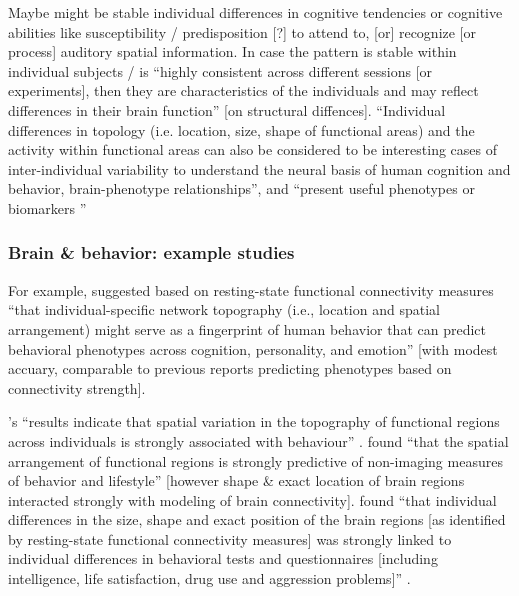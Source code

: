 %
Maybe might be stable individual differences in cognitive tendencies or
cognitive abilities like susceptibility / predisposition [?] to attend to, [or]
recognize [or process] auditory spatial information.
In case the pattern is stable within individual subjects / is ``highly
consistent across different sessions [or experiments], then they are
characteristics of the individuals and may reflect differences in their brain
function'' \citep{kanai2011structural} [on structural diffences].
%
``Individual differences in topology (i.e. location, size, shape of functional
areas) and the activity within functional areas can also be considered to be
interesting cases of inter-individual variability to understand the neural basis
of human cognition and behavior, brain-phenotype relationships'', and ``present
useful phenotypes or biomarkers \citep{glasser2016multi,
vanhorn2008individual}''


\subsubsection{Brain \& behavior: example studies}

%
For example, \citet{kong2019spatial} suggested based on resting-state functional
connectivity measures ``that individual-specific network topography (i.e.,
location and spatial arrangement) might serve as a fingerprint of human behavior
that can predict behavioral phenotypes across cognition, personality, and
emotion'' \citep{kong2019spatial} [with modest accuary, comparable to previous
reports predicting phenotypes based on connectivity strength].

%
\citep{bijsterbosch2018relationship}'s ``results indicate that spatial variation
in the topography of functional regions across individuals is strongly
associated with behaviour'' \citep{bijsterbosch2018relationship}.
%
\citet{bijsterbosch2018relationship} found ``that the spatial arrangement of
functional regions is strongly predictive of non-imaging measures of behavior
and lifestyle'' [however shape \& exact location of brain regions interacted
strongly with  modeling of brain connectivity].
%
\citet{bijsterbosch2018relationship} found ``that individual differences in the
size, shape and exact position of the brain regions [as identified by
resting-state functional connectivity measures] was strongly linked to
individual differences in behavioral tests and questionnaires [including
intelligence, life satisfaction, drug use and aggression problems]''
\citep{bijsterbosch2018relationship}.

